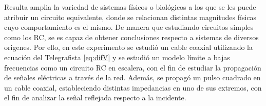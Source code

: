 Resulta amplia la variedad de sistemas físicos o biológicos a los que se les puede atribuir un circuito equivalente, donde se relacionan distintas magnitudes físicas cuyo comportamiento es el mismo. De manera que estudiando circuitos simples como los RC, se es capaz de obtener conclusiones respecto a sistemas de diversos origenes. Por ello, en este experimento se estudió un cable coaxial utilizando la ecuación del Telegrafista \eqref{eq:difV} y se estudió un modelo límite a bajas frecuencias como un circuito RC en escalera, con el fin de estudiar la propagación de señales eléctricas a través de la red. Además, se propagó un pulso cuadrado en un cable coaxial, estableciendo distintas impedancias en uno de sus extremos, con el fin de analizar la señal reflejada respecto a la incidente.